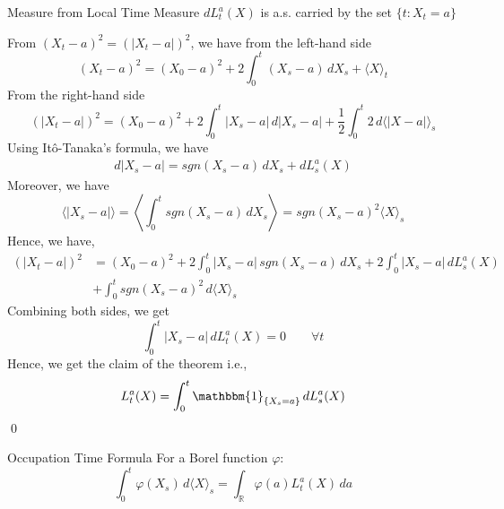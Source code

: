 \documentclass[12pt,a4paper]{article}
\newcommand{\R}{\mathbb{R}}
\renewenvironment{proof}
    {\begin{trivlist}\item[\hskip\labelsep\color{blue}\bfseries Proof:]}
    {\qed\end{trivlist}}
\begin{document}
\pagebreak
\begin{theorem}{Measure from Local Time}{}
    Measure $dL_t^a(X)$ is a.s. carried by the set $\{t: X_t=a\}$
\end{theorem}
\begin{proof}
    From $(X_t-a)^2 = (|X_t-a|)^2$, we have from the left-hand side
    $$
    (X_t-a)^2 = (X_0-a)^2  + 2\int_0^t (X_s-a)\, dX_s + \langle X\rangle_t
    $$
    From the right-hand side
    $$
    (|X_t-a|)^2 = (X_0-a)^2 + 2\int_0^t |X_s-a|\, d|X_s-a|  +\frac{1}{2}\int_0^t 2\, d\langle|X-a|\rangle_s
    $$
    Using It\^{o}-Tanaka's formula, we have
    \begin{align*}
        d|X_s-a| = sgn(X_s-a)\, dX_s + dL_s^a(X)
    \end{align*}
    Moreover, we have
    $$
    \langle |X_s-a|\rangle = \left\langle \int_0^t sgn(X_s-a)\, dX_s\right\rangle = sgn(X_s-a)^2 \langle X\rangle_s
    $$
    Hence, we have,
    \begin{align*}
        (|X_t-a|)^2 &= (X_0-a)^2 + 2\int_0^t |X_s-a|\,sgn(X_s-a)\, dX_s + 2\int_0^t  |X_s-a|\, dL_s^a(X) \\
        &+ \int_0^t sgn(X_s-a)^2\, d\langle X\rangle_s
    \end{align*}
    Combining both sides, we get
    $$
    \int_0^t |X_s-a|\, dL_t^a(X) = 0\qquad\forall t
    $$
    Hence, we get the claim of the theorem i.e.,
    $$
    L_t^a(X) = \int_0^t \mathbbm{1}_{\{X_s=a\}} \, dL_s^a(X)
    $$
\end{proof}
\begin{theorem}{Occupation Time Formula}{}
For a Borel function $\varphi$:
    $$
    \int_0^t \varphi(X_s)\, d\langle X\rangle_s = \int_\R \varphi(a) L_t^a(X)\, da
    $$
\end{theorem}
\pagebreak
\end{document}
